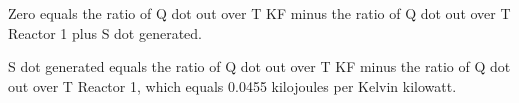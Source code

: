 Zero equals the ratio of Q dot out over T KF minus the ratio of Q dot out over T Reactor 1 plus S dot generated.

S dot generated equals the ratio of Q dot out over T KF minus the ratio of Q dot out over T Reactor 1, which equals 0.0455 kilojoules per Kelvin kilowatt.